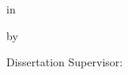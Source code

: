 {\begin{titlepage}
\begin{center}
      {\Arial\bfseries\@edegree}


      in

      {\Arial\bfseries\@esubject}


      by

      {\Arial\bfseries\@eauthor}


      \xiaosan
      Dissertation Supervisor:
      \@esupervisor{}


      {\sanhao\Arial\bfseries\@edate}
    \end{center}
  \end{titlepage}
}

\makeatother